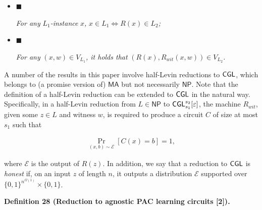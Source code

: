 \documentclass[10pt,a4paper]{article}
\begin{document}
\begin{itemize}


\item[] 
$\blacksquare$ 


\emph{For any }$L_{1}$\emph{-instance }$x$\emph{, }$x\in L_{1}\iff R(x)\in L_{2}$\emph{;}\par





\item[] 
$\blacksquare$ 


\emph{For any }$(x,w)\in V_{L_{1}}$\emph{, it holds that }$(R(x),R_{wit}(x,w))\in V_{L_{2}}$\emph{.}\par





\end{itemize}






A number of the results in this paper involve half-Levin reductions to ${\sf CGL}$, which belongs to (a promise version of) ${\mathsf{MA}}$ but not necessarily ${\mathsf{NP}}$. Note that the definition of a half-Levin reduction can be extended to ${\sf CGL}$ in the natural way. Specifically, in a half-Levin reduction from $L\in{\mathsf{NP}}$ to ${\sf CGL}_{s_{1}}^{s_{2}}[\varepsilon]$, the machine $R_{wit}$, given some $z\in L$ and witness $w$, is required to produce a circuit $C$ of size at most $s_{1}$ such that\par


\[\begin{gathered}
\Pr_{(x,b)\sim\mathcal{E}}[C(x)=b]=1,
\end{gathered}\]


where $\mathcal{E}$ is the output of $R(z)$. In addition, we say that a reduction to ${\sf CGL}$ is \emph{honest} if, on an input $z$ of length $n$, it outputs a distribution $\mathcal{E}$ supported over $\{0,1\}^{n^{\Omega(1)}}\times\{0,1\}$.\par





\par\medskip\noindent\textbf{
\textbf{Definition 28}\textbf{ }(Reduction to agnostic PAC learning circuits [2])\textbf{.}
}\par
\end{document}
